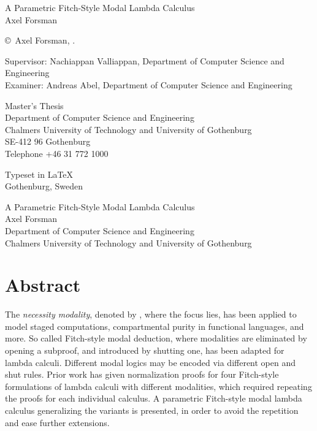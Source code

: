 \documentclass[12pt,twoside,openright]{report}
\numberwithin{equation}{chapter}
\numberwithin{figure}{chapter}
\numberwithin{table}{chapter}
\theoremstyle{definition}\newtheorem{definition}{Definition}
\newcommand{\oneLineTitle}{A Parametric Fitch-Style Modal Lambda Calculus}
\begin{document}
{
\newpage
\thispagestyle{plain}
\setlength{\parskip}{1cm}
\vspace*{4.5cm}
\oneLineTitle \\
Axel Forsman

\copyright~Axel Forsman, \the\year.

Supervisor: Nachiappan Valliappan, Department of Computer Science and Engineering \\
Examiner: Andreas Abel, Department of Computer Science and Engineering

Master's Thesis \the\year \\
Department of Computer Science and Engineering \\
Chalmers University of Technology and University of Gothenburg \\
SE-412 96 Gothenburg \\
Telephone +46 31 772 1000

\vfill

Typeset in \LaTeX \\
Gothenburg, Sweden \the\year
}

\newpage
\thispagestyle{plain}
\oneLineTitle \\
Axel Forsman \\
Department of Computer Science and Engineering \\
Chalmers University of Technology and University of Gothenburg

\section*{Abstract}
The \emph{necessity modality}, denoted by \Box, where the focus lies,
has been applied to model staged computations,
compartmental purity in functional languages,
and more.
So called Fitch-style modal deduction,
where modalities are eliminated by opening a subproof,
and introduced by shutting one,
has been adapted for lambda calculi.
Different modal logics may be encoded via different open and shut rules.
Prior work \cite{valliappan22} has given normalization proofs
for four Fitch-style formulations of lambda calculi with different modalities,
which required repeating the proofs for each individual calculus.
A parametric Fitch-style modal lambda calculus generalizing the variants is presented,
in order to avoid the repetition and ease further extensions.
\end{document}
